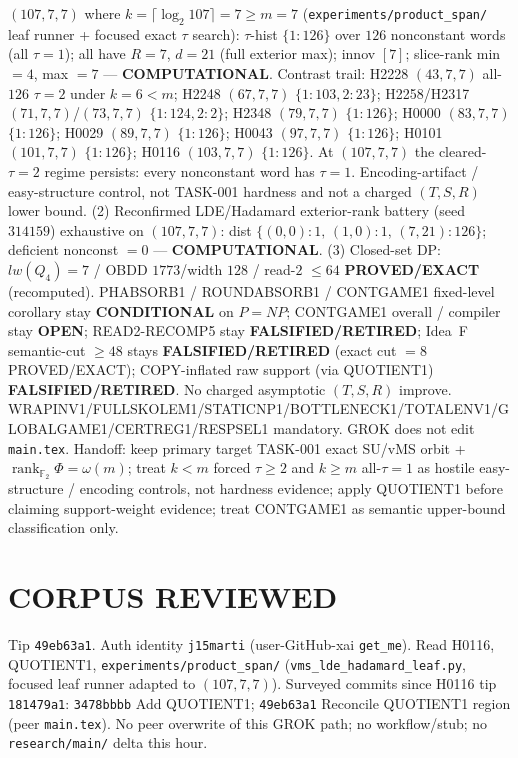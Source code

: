 \documentclass[11pt]{article}
\begin{document}
$(107,7,7)$ where $k=\lceil\log_2 107\rceil=7{\ge}m{=}7$
(\texttt{experiments/product\_span/} leaf runner + focused exact $\tau$ search):
$\tau$-hist $\{1{:}126\}$ over $126$ nonconstant words (all $\tau{=}1$);
all have $R{=}7$, $d{=}21$ (full exterior max); innov $[7]$;
slice-rank min $=4$, max $=7$ --- \textbf{COMPUTATIONAL}.
Contrast trail: H2228 $(43,7,7)$ all-$126$ $\tau{=}2$ under $k{=}6{<}m$;
H2248 $(67,7,7)$ $\{1{:}103,2{:}23\}$; H2258/H2317 $(71,7,7)$/$(73,7,7)$ $\{1{:}124,2{:}2\}$;
H2348 $(79,7,7)$ $\{1{:}126\}$; H0000 $(83,7,7)$ $\{1{:}126\}$; H0029 $(89,7,7)$ $\{1{:}126\}$;
H0043 $(97,7,7)$ $\{1{:}126\}$; H0101 $(101,7,7)$ $\{1{:}126\}$; H0116 $(103,7,7)$ $\{1{:}126\}$.
At $(107,7,7)$ the cleared-$\tau{=}2$ regime persists:
every nonconstant word has $\tau{=}1$. Encoding-artifact / easy-structure control,
not TASK-001 hardness and not a charged $(T,S,R)$ lower bound.
(2) Reconfirmed LDE/Hadamard exterior-rank battery (seed~$314159$) exhaustive on
$(107,7,7)$: dist $\{(0,0){:}1,\,(1,0){:}1,\,(7,21){:}126\}$; deficient nonconst $=0$ ---
\textbf{COMPUTATIONAL}.
(3) Closed-set DP: $lw(Q_4)=7$ / OBDD $1773$/width $128$ / read-$2$ $\le64$
\textbf{PROVED/EXACT} (recomputed).
PHABSORB1 / ROUNDABSORB1 / CONTGAME1 fixed-level corollary stay \textbf{CONDITIONAL} on $P=NP$;
CONTGAME1 overall / compiler stay \textbf{OPEN}; READ2-RECOMP5 stay \textbf{FALSIFIED/RETIRED};
Idea~F semantic-cut $\ge48$ stays \textbf{FALSIFIED/RETIRED} (exact cut $=8$ PROVED/EXACT);
COPY-inflated raw support (via QUOTIENT1) \textbf{FALSIFIED/RETIRED}.
No charged asymptotic $(T,S,R)$ improve.
WRAPINV1/FULLSKOLEM1/STATICNP1/BOTTLENECK1/TOTALENV1/GLOBALGAME1/CERTREG1/RESPSEL1 mandatory.
GROK does not edit \texttt{main.tex}.
Handoff: keep primary target TASK-001 exact SU/vMS orbit + $\operatorname{rank}_{\mathbb F_2}\Phi=\omega(m)$;
treat $k{<}m$ forced $\tau{\ge}2$ and $k{\ge}m$ all-$\tau{=}1$ as hostile easy-structure /
encoding controls, not hardness evidence; apply QUOTIENT1 before claiming support-weight
evidence; treat CONTGAME1 as semantic upper-bound classification only.

\section*{CORPUS REVIEWED}
Tip \texttt{49eb63a1}. Auth identity \texttt{j15marti} (user-GitHub-xai \texttt{get\_me}).
Read H0116, QUOTIENT1, \texttt{experiments/product\_span/}
(\texttt{vms\_lde\_hadamard\_leaf.py}, focused leaf runner adapted to $(107,7,7)$).
Surveyed commits since H0116 tip \texttt{181479a1}: \texttt{3478bbbb} Add QUOTIENT1;
\texttt{49eb63a1} Reconcile QUOTIENT1 region (peer \texttt{main.tex}).
No peer overwrite of this GROK path; no workflow/stub; no \texttt{research/main/} delta this hour.
\end{document}
